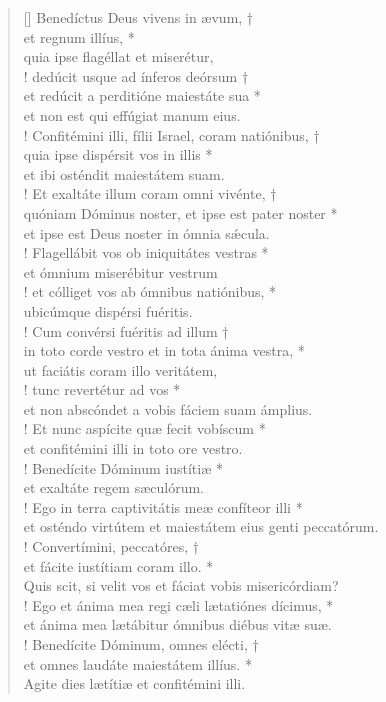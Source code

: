 \begin{verse}[\versewidth]
Benedíctus Deus vivens in ævum, †\\
et regnum illíus, *\\
quia ipse flagéllat et miserétur,\\!
\vin dedúcit usque ad ínferos deórsum †\\
\vin et redúcit a perditióne maiestáte sua *\\
\vin et non est qui effúgiat manum eius.\\!
Confitémini illi, fílii Israel, coram natiónibus, †\\
quia ipse dispérsit vos in illis *\\
et ibi osténdit maiestátem suam.\\!
\vin Et exaltáte illum coram omni vivénte, †\\
\vin quóniam Dóminus noster, et ipse est pater noster *\\
\vin et ipse est Deus noster in ómnia s\'{æ}cula.\\!
Flagellábit vos ob iniquitátes vestras *\\
et ómnium miserébitur vestrum\\!
\vin et cólliget vos ab ómnibus natiónibus, *\\
\vin ubicúmque dispérsi fuéritis.\\!
Cum convérsi fuéritis ad illum †\\
in toto corde vestro et in tota ánima vestra, *\\
ut faciátis coram illo veritátem,\\!
\vin tunc revertétur ad vos *\\
\vin et non abscóndet a vobis fáciem suam ámplius.\\!
Et nunc aspícite quæ fecit vobíscum *\\
et confitémini illi in toto ore vestro.\\!
\vin Benedícite Dóminum iustítiæ *\\
\vin et exaltáte regem sæculórum.\\!
Ego in terra captivitátis meæ confíteor illi *\\
et osténdo virtútem et maiestátem eius genti peccatórum.\\!
\vin Convertímini, peccatóres, †\\
\vin et fácite iustítiam coram illo. *\\
\vin Quis scit, si velit vos et fáciat vobis misericórdiam?\\!
Ego et ánima mea regi cæli lætatiónes dícimus, *\\
et ánima mea lætábitur ómnibus diébus vitæ suæ.\\!
\vin Benedícite Dóminum, omnes elécti, †\\
\vin et omnes laudáte maiestátem illíus. *\\
\vin Agite dies lætítiæ et confitémini illi.\\
\end{verse}
\vspace{1cm}


